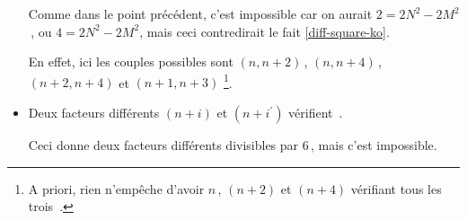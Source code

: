 \begin{itemize}
	\smallskip
	\noindent
	Comme dans le point précédent, c'est impossible car on aurait $2 = 2 N^2 - 2 M^2$\,, ou $4 = 2 N^2 - 2 M^2$, mais ceci contredirait le fait \ref{diff-square-ko}. 
		
	\smallskip
		
	\noindent
	En effet, ici les couples possibles sont $(n, n + 2)$\,, $(n, n + 4)$\,,  $(n + 2, n + 4)$ et $(n + 1, n + 3)$
	\footnote{
		A priori, rien n'empêche d'avoir $n$\,, $(n + 2)$ et $(n + 4)$ vérifiant tous les trois \,.
	}.


	\medskip
	\item Deux facteurs différents $(n+i)$ et $(n+i^\prime)$ vérifient \,.
		
	\smallskip
	\noindent
	Ceci donne deux facteurs différents divisibles par $6$\,, mais c'est impossible. \qedhere
\end{itemize}